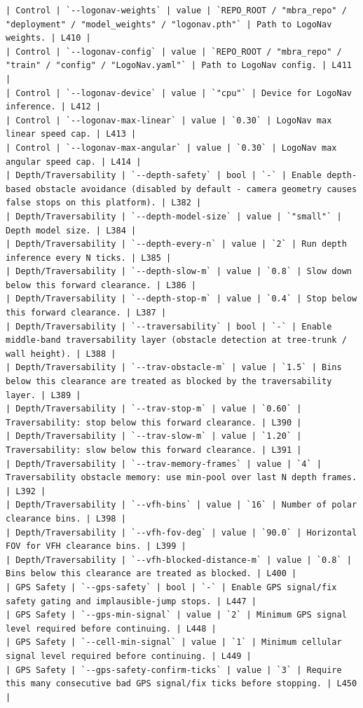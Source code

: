 \documentclass[11pt]{article}
\begin{document}
\begin{lstlisting}
| Control | `--logonav-weights` | value | `REPO_ROOT / "mbra_repo" / "deployment" / "model_weights" / "logonav.pth"` | Path to LogoNav weights. | L410 |
| Control | `--logonav-config` | value | `REPO_ROOT / "mbra_repo" / "train" / "config" / "LogoNav.yaml"` | Path to LogoNav config. | L411 |
| Control | `--logonav-device` | value | `"cpu"` | Device for LogoNav inference. | L412 |
| Control | `--logonav-max-linear` | value | `0.30` | LogoNav max linear speed cap. | L413 |
| Control | `--logonav-max-angular` | value | `0.30` | LogoNav max angular speed cap. | L414 |
| Depth/Traversability | `--depth-safety` | bool | `-` | Enable depth-based obstacle avoidance (disabled by default - camera geometry causes false stops on this platform). | L382 |
| Depth/Traversability | `--depth-model-size` | value | `"small"` | Depth model size. | L384 |
| Depth/Traversability | `--depth-every-n` | value | `2` | Run depth inference every N ticks. | L385 |
| Depth/Traversability | `--depth-slow-m` | value | `0.8` | Slow down below this forward clearance. | L386 |
| Depth/Traversability | `--depth-stop-m` | value | `0.4` | Stop below this forward clearance. | L387 |
| Depth/Traversability | `--traversability` | bool | `-` | Enable middle-band traversability layer (obstacle detection at tree-trunk / wall height). | L388 |
| Depth/Traversability | `--trav-obstacle-m` | value | `1.5` | Bins below this clearance are treated as blocked by the traversability layer. | L389 |
| Depth/Traversability | `--trav-stop-m` | value | `0.60` | Traversability: stop below this forward clearance. | L390 |
| Depth/Traversability | `--trav-slow-m` | value | `1.20` | Traversability: slow below this forward clearance. | L391 |
| Depth/Traversability | `--trav-memory-frames` | value | `4` | Traversability obstacle memory: use min-pool over last N depth frames. | L392 |
| Depth/Traversability | `--vfh-bins` | value | `16` | Number of polar clearance bins. | L398 |
| Depth/Traversability | `--vfh-fov-deg` | value | `90.0` | Horizontal FOV for VFH clearance bins. | L399 |
| Depth/Traversability | `--vfh-blocked-distance-m` | value | `0.8` | Bins below this clearance are treated as blocked. | L400 |
| GPS Safety | `--gps-safety` | bool | `-` | Enable GPS signal/fix safety gating and implausible-jump stops. | L447 |
| GPS Safety | `--gps-min-signal` | value | `2` | Minimum GPS signal level required before continuing. | L448 |
| GPS Safety | `--cell-min-signal` | value | `1` | Minimum cellular signal level required before continuing. | L449 |
| GPS Safety | `--gps-safety-confirm-ticks` | value | `3` | Require this many consecutive bad GPS signal/fix ticks before stopping. | L450 |

\end{lstlisting}
\end{document}
